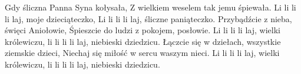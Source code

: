 \beginverse
Gdy śliczna Panna Syna kołysała,
Z wielkiem weselem tak jemu śpiewała.
Li li li li laj, moje dzieciąteczko,
Li li li li laj, śliczne paniąteczko.
\endverse
\beginverse
Przybądźcie z nieba, święci Aniołowie,
Śpieszcie do ludzi z pokojem, posłowie.
Li li li li laj, wielki królewiczu,
li li li li laj, niebieski dziedzicu.
\endverse
\beginverse
Łączcie się w dziełach, wszystkie ziemskie dzieci,
Niechaj się miłość w sercu waszym nieci.
Li li li li laj, wielki królewiczu,
li li li li laj, niebieski dziedzicu.
\endverse
\endsong
